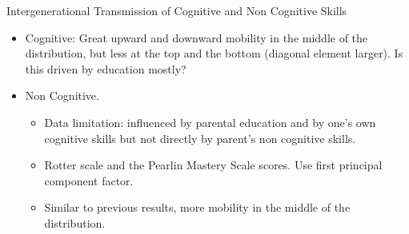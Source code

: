 \documentclass{beamer}
\begin{document}
\begin{frame}[label=Return5]{Intergenerational Transmission of Cognitive and Non Cognitive Skills}

\begin{itemize}
\item Cognitive: Great upward and downward mobility in the middle of the distribution, but less at the top and the bottom (diagonal element larger). Is this driven by education mostly? \hyperlink{Transmission2}{}

\item Non Cognitive. 
\begin{itemize}
\item Data limitation: influenced by parental education and by one's own cognitive skills but not directly by parent's non cognitive skills. \hyperlink{Transmission1}{}
\item Rotter scale and the Pearlin Mastery Scale scores. Use first principal component factor.
\item Similar to previous results, more mobility in the middle of the distribution. 
\end{itemize}

\end{itemize}

\end{frame}


\end{document}

